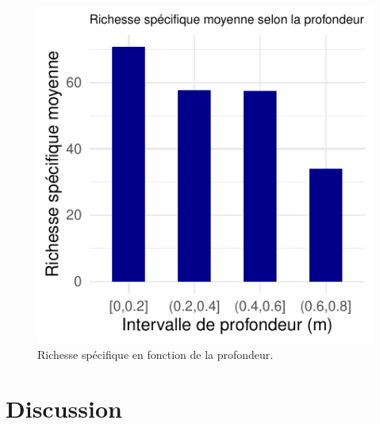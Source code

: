 \documentclass[9pt,twocolumn,twoside,final]{pnas-new}
\begin{document}
\begin{figure}

{\centering \includegraphics{RMarkdown-article_files/figure-latex/fig_profondeur-1} 

}

\caption{Richesse spécifique en fonction de la profondeur.}\label{fig:fig_profondeur}
\end{figure}

\section{Discussion}\label{discussion}
\end{document}
